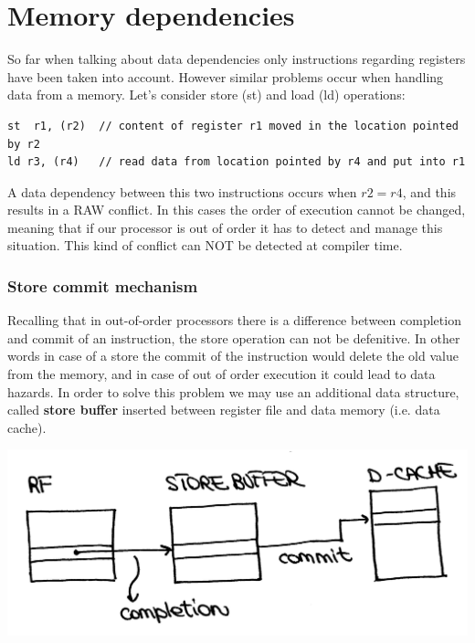 \section{Memory dependencies}
So far when talking about data dependencies only instructions regarding
registers have been taken into account. However similar problems occur when
handling data from a memory. Let's consider store (st) and load (ld)
operations:
\begin{verbatim}
st  r1, (r2)  // content of register r1 moved in the location pointed by r2
ld r3, (r4)   // read data from location pointed by r4 and put into r1
\end{verbatim}
A data dependency between this two instructions occurs when $r2 = r4$, and this
results in a RAW conflict. In this cases the order of execution cannot be
changed, meaning that if our processor is out of order it has to detect and
manage this situation. This kind of conflict can NOT be detected at compiler
time.
\subsubsection{Store commit mechanism}
Recalling that in out-of-order processors there is a difference between
completion and commit of an instruction, the store operation can not be
defenitive. In other words in case of a store the commit of the instruction
would delete the old value from the memory, and in case of out of order
execution it could lead to data hazards.  In order to solve this problem we may
use an additional data structure, called \textbf{store buffer} inserted between
register file and data memory (i.e. data cache).
\begin{center}
  \includegraphics[width=0.7\linewidth]{img/img3/30}
\end{center}
